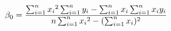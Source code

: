 \documentclass[preview]{standalone}
\begin{document}
\begin{align*}
{\special{dvisvgm:raw <g id='unique000'>}\beta_0=\frac{\sum_{i=1}^n{{x_i}^2}\sum_{i=1}^n{y_i}-\sum_{i=1}^n{x_i}\sum_{i=1}^n{x_i y_i}}{n\sum_{i=1}^n{{x_i}^2}-(\sum_{i=1}^n{x_i})^2}}\special{dvisvgm:raw </g>}
\end{align*}
\end{document}
